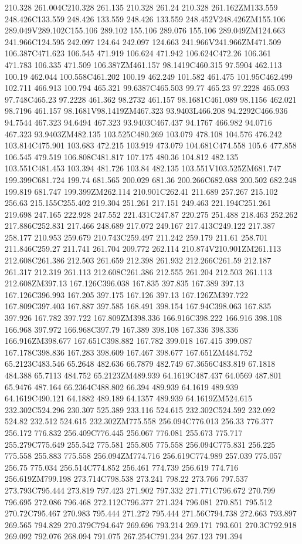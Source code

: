 210.328 261.004C210.328 261.135 210.328 261.24 210.328 261.162ZM133.559 248.426C133.559 248.426 133.559 248.426 133.559 248.452V248.426ZM155.106 289.049V289.102C155.106 289.102 155.106 289.076 155.106 289.049ZM124.663 241.966C124.595 242.097 124.64 242.097 124.663 241.966V241.966ZM471.509 106.387C471.623 106.545 471.919 106.624 471.942 106.624C472.26 106.361 471.783 106.335 471.509 106.387ZM461.157 98.1419C460.315 97.5904 462.113 100.19 462.044 100.558C461.202 100.19 462.249 101.582 461.475 101.95C462.499 102.711 466.913 100.794 465.321 99.6387C465.503 99.77 465.23 97.2228 465.093 97.748C465.23 97.2228 461.362 98.2732 461.157 98.1681C461.089 98.1156 462.021 98.7196 461.157 98.1681V98.1419ZM467.323 93.9403L466.208 94.2292C466.936 94.7544 467.323 94.6494 467.323 93.9403C467.437 94.1767 466.982 94.0716 467.323 93.9403ZM482.135 103.525C480.269 103.079 478.108 104.576 476.242 103.814C475.901 103.683 472.215 103.919 473.079 104.681C474.558 105.6 477.858 106.545 479.519 106.808C481.817 107.175 480.36 104.812 482.135 103.551C481.453 103.394 481.726 103.84 482.135 103.551V103.525ZM681.747 199.399C681.724 199.74 681.565 200.029 681.36 200.266C682.088 200.502 682.248 199.819 681.747 199.399ZM262.114 210.901C262.41 211.689 257.267 215.102 256.63 215.155C255.402 219.304 251.261 217.151 249.463 221.194C251.261 219.698 247.165 222.928 247.552 221.431C247.87 220.275 251.488 218.463 252.262 217.886C252.831 217.466 248.689 217.072 249.167 217.413C249.122 217.387 258.177 210.953 259.679 210.743C259.497 211.242 259.179 211.61 258.701 211.846C259.27 211.741 261.704 209.772 262.114 210.874V210.901ZM261.113 212.608C261.386 212.503 261.659 212.398 261.932 212.266C261.59 212.187 261.317 212.319 261.113 212.608C261.386 212.555 261.204 212.503 261.113 212.608ZM397.13 167.126C396.038 167.835 397.835 167.389 397.13 167.126C396.993 167.205 397.175 167.126 397.13 167.126ZM397.722 167.809C397.403 167.887 397.585 168.491 398.154 167.94C398.063 167.835 397.926 167.782 397.722 167.809ZM398.336 166.916C398.222 166.916 398.108 166.968 397.972 166.968C397.79 167.389 398.108 167.336 398.336 166.916ZM398.677 167.651C398.882 167.782 399.018 167.415 399.087 167.178C398.836 167.283 398.609 167.467 398.677 167.651ZM484.752 65.2123C483.546 65.2648 482.636 66.7879 482.749 67.3656C483.819 67.1818 484.388 65.7113 484.752 65.2123ZM489.939 64.1619C487.437 64.0569 487.801 65.9476 487.164 66.2364C488.802 66.394 489.939 64.1619 489.939 64.1619C490.121 64.1882 489.189 64.1357 489.939 64.1619ZM524.615 232.302C524.296 230.307 525.389 233.116 524.615 232.302C524.592 232.092 524.82 232.512 524.615 232.302ZM775.558 256.094C776.013 256.33 776.377 256.172 776.832 256.409C776.445 256.067 776.081 255.673 775.717 255.279C775.649 255.542 775.581 255.805 775.558 256.094C775.831 256.225 775.558 255.883 775.558 256.094ZM774.716 256.619C774.989 257.039 775.057 256.75 775.034 256.514C774.852 256.461 774.739 256.619 774.716 256.619ZM799.198 273.714C798.538 273.241 798.22 273.766 797.537 273.793C795.444 273.819 797.423 271.902 797.332 271.771C796.672 270.799 796.695 272.086 796.468 272.112C796.377 271.324 796.081 270.851 795.512 270.72C795.467 270.983 795.444 271.272 795.444 271.56C794.738 272.663 793.897 269.565 794.829 270.379C794.647 269.696 793.214 269.171 793.601 270.3C792.918 269.092 792.076 268.094 791.075 267.254C791.234 267.123 791.394 